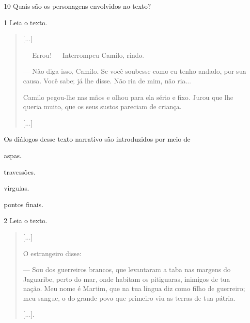 \num{10} Quais são os personagens envolvidos no texto?


\pagebreak


\num{1} Leia o texto.

\begin{quote}
{[}...{]}

— Errou! — Interrompeu Camilo, rindo.

— Não diga isso, Camilo. Se você soubesse como eu tenho andado, por
sua causa. Você sabe; já lhe disse. Não ria de mim, não ria...

Camilo pegou-lhe nas mãos e olhou para ela sério e fixo. Jurou que lhe
queria muito, que os seus sustos pareciam de criança.

{[}...{]}

\end{quote}

Os diálogos desse texto narrativo são introduzidos por meio de

\begin{minipage}{.5\textwidth}
\begin{escolha}
\item aspas.

\item travessões.

\item vírgulas.

\item pontos finais.
\end{escolha}
\end{minipage}

\num{2} Leia o texto.

\begin{quote}
{[}...{]}

O estrangeiro disse:

— Sou dos guerreiros brancos, que levantaram a taba nas margens do
Jaguaribe, perto do mar, onde habitam os pitiguaras, inimigos de tua
nação. Meu nome é Martim, que na tua língua diz como filho de guerreiro;
meu sangue, o do grande povo que primeiro viu as terras de tua pátria.

{[}...{]}.

\end{quote}

